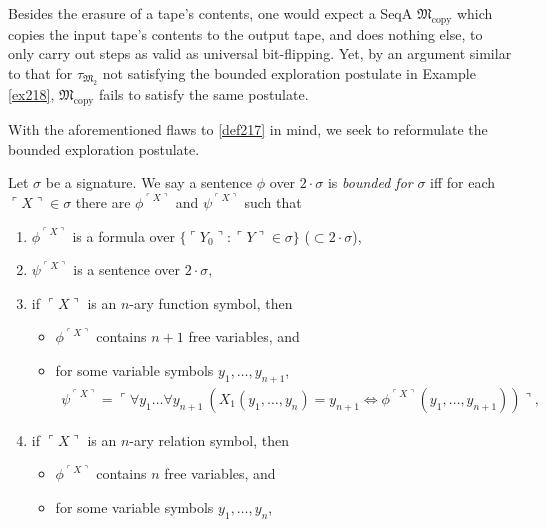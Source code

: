 \documentclass[12pt]{article}
\numberwithin{equation}{section}
\begin{document}
Besides the erasure of a tape's contents, one would expect a SeqA $\mathfrak{M}_{\text{copy}}$ which copies the input tape's contents to the output tape, and does nothing else, to only carry out steps as valid as universal bit-flipping. Yet, by an argument similar to that for $\tau_{\mathfrak{M}_2}$ not satisfying the bounded exploration postulate in Example \ref{ex218}, $\mathfrak{M}_{\text{copy}}$ fails to satisfy the same postulate. 

With the aforementioned flaws to \ref{def217} in mind, we seek to reformulate the bounded exploration postulate.

\begin{defi}\label{def220}
Let $\sigma$ be a signature. We say a sentence $\phi$ over $2 \cdot \sigma$ is \emph{bounded for} $\sigma$ iff for each $\ulcorner X \urcorner \in \sigma$ there are $\phi^{\ulcorner X \urcorner}$ and $\psi^{\ulcorner X \urcorner}$ such that
\begin{enumerate}[label=(\alph*)]
    \item $\phi^{\ulcorner X \urcorner}$ is a formula over $\{\ulcorner Y_0 \urcorner : \ulcorner Y \urcorner \in \sigma\}$ ($\subset 2 \cdot \sigma$),
    \item $\psi^{\ulcorner X \urcorner}$ is a sentence over $2 \cdot \sigma$,
    \item if $\ulcorner X \urcorner$ is an $n$-ary function symbol, then 
    \begin{itemize}[label=$\circ$, leftmargin=20pt]
        \item $\phi^{\ulcorner X \urcorner}$ contains $n + 1$ free variables, and
        \item for some variable symbols $y_1, \dots, y_{n+1}$,
        \begin{align*}
            \psi^{\ulcorner X \urcorner} = \ulcorner \forall y_1 \dots \forall y_{n+1} \ (X_1(y_1, \dots, y_n) = y_{n+1} \iff \phi^{\ulcorner X \urcorner}(y_1, \dots, y_{n+1})) \urcorner \text{,}
        \end{align*}
    \end{itemize}
    \item if $\ulcorner X \urcorner$ is an $n$-ary relation symbol, then 
    \begin{itemize}[label=$\circ$, leftmargin=20pt]
        \item $\phi^{\ulcorner X \urcorner}$ contains $n$ free variables, and
        \item for some variable symbols $y_1, \dots, y_n$,
        \begin{align*}

\end{align*}
\end{itemize}
\end{enumerate}
\end{defi}
\end{document}
